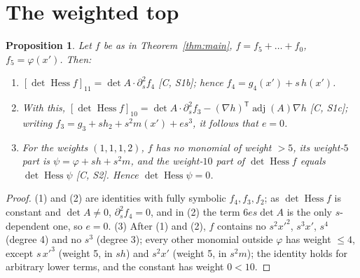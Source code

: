 \documentclass[11pt]{article}
\newtheorem{proposition}[theorem]{Proposition}
\theoremstyle{remark}
\newcommand{\Hess}{\operatorname{Hess}}
\newcommand{\adj}{\operatorname{adj}}
\begin{document}
\section{The weighted top}
\begin{proposition}\label{prop:top}
Let $f$ be as in Theorem~\ref{thm:main}, $f=f_5+\dots+f_0$, $f_5=\varphi(x')$. Then:
\begin{enumerate}
\item $[\det\Hess f]_{11}=\det A\cdot\partial_s^2f_4$ \emph{[C, S1b]}; hence $f_4=g_4(x')+s\,h(x')$.
\item With this, $[\det\Hess f]_{10}=\det A\cdot\partial_s^2f_3-(\nabla h)^{\mathsf T}\adj(A)\nabla h$ \emph{[C, S1c]}; writing $f_3=g_3+sh_2+s^2m(x')+es^3$, it follows that $e=0$.
\item For the weights $(1,1,1,2)$, $f$ has no monomial of weight $>5$, its weight-$5$ part is $\psi=\varphi+sh+s^2m$, and the weight-$10$ part of $\det\Hess f$ equals $\det\Hess\psi$ \emph{[C, S2]}. Hence $\det\Hess\psi=0$.
\end{enumerate}
\end{proposition}
\begin{proof}
(1) and (2) are identities with fully symbolic $f_4,f_3,f_2$; as $\det\Hess f$ is constant and $\det A\ne0$, $\partial_s^2f_4=0$, and in (2) the term $6e s\det A$ is the only $s$-dependent one, so $e=0$. (3) After (1) and (2), $f$ contains no $s^2x'^2$, $s^3x'$, $s^4$ (degree 4) and no $s^3$ (degree 3); every other monomial outside $\varphi$ has weight $\le4$, except $s\,x'^3$ (weight 5, in $sh$) and $s^2x'$ (weight 5, in $s^2m$); the identity holds for arbitrary lower terms, and the constant has weight $0<10$.
\end{proof}
\end{document}
